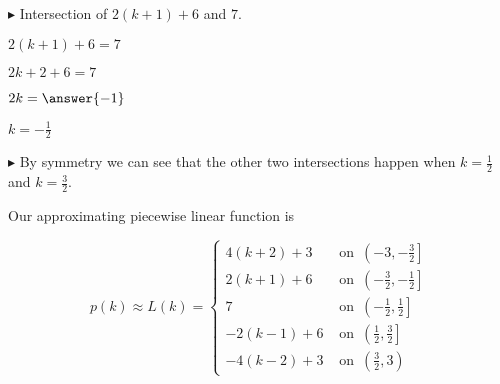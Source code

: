 \documentclass{ximera}
\begin{document}
$\blacktriangleright$  Intersection of $2(k+1)+6$ and $7$.

\begin{procedure}

$2(k+1)+6 = 7$

$2k + 2 + 6 = 7$

$2k = \answer{-1}$

$k = -\frac{1}{2}$

\end{procedure}




$\blacktriangleright$  By symmetry we can see that the other two intersections happen when $k = \frac{1}{2}$  and $k = \frac{3}{2}$.



Our approximating piecewise linear function is 



\[
p(k) \approx L(k) = 
\begin{cases}
  4(k+2)+3       &          \text{ on } \,     \left(-3, -\frac{3}{2}\right]   \\
  2(k+1)+6       &          \text{ on } \,     \left(-\frac{3}{2}, -\frac{1}{2}\right]   \\
  7              &          \text{ on } \,     \left(-\frac{1}{2}, \frac{1}{2}\right]   \\
  -2(k-1)+6      &          \text{ on } \,     \left(\frac{1}{2}, \frac{3}{2}\right]   \\
  -4(k-2)+3      &          \text{ on } \,     \left(\frac{3}{2}, 3\right)   
\end{cases}
\]
\end{document}
